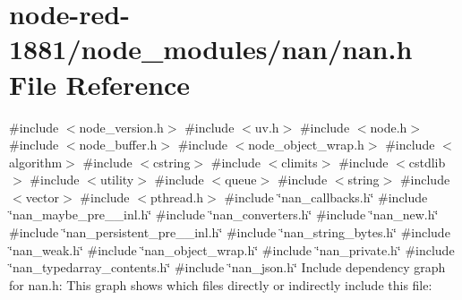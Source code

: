 \section{node-\/red-\/1881/node\+\_\+modules/nan/nan.h File Reference}
\label{nan_8h}
{\ttfamily \#include $<$node\+\_\+version.\+h$>$}\newline
{\ttfamily \#include $<$uv.\+h$>$}\newline
{\ttfamily \#include $<$node.\+h$>$}\newline
{\ttfamily \#include $<$node\+\_\+buffer.\+h$>$}\newline
{\ttfamily \#include $<$node\+\_\+object\+\_\+wrap.\+h$>$}\newline
{\ttfamily \#include $<$algorithm$>$}\newline
{\ttfamily \#include $<$cstring$>$}\newline
{\ttfamily \#include $<$climits$>$}\newline
{\ttfamily \#include $<$cstdlib$>$}\newline
{\ttfamily \#include $<$utility$>$}\newline
{\ttfamily \#include $<$queue$>$}\newline
{\ttfamily \#include $<$string$>$}\newline
{\ttfamily \#include $<$vector$>$}\newline
{\ttfamily \#include $<$pthread.\+h$>$}\newline
{\ttfamily \#include \char`\"{}nan\+\_\+callbacks.\+h\char`\"{}}\newline
{\ttfamily \#include \char`\"{}nan\+\_\+maybe\+\_\+pre\+\_\+\_\+inl.\+h\char`\"{}}\newline
{\ttfamily \#include \char`\"{}nan\+\_\+converters.\+h\char`\"{}}\newline
{\ttfamily \#include \char`\"{}nan\+\_\+new.\+h\char`\"{}}\newline
{\ttfamily \#include \char`\"{}nan\+\_\+persistent\+\_\+pre\+\_\+\_\+inl.\+h\char`\"{}}\newline
{\ttfamily \#include \char`\"{}nan\+\_\+string\+\_\+bytes.\+h\char`\"{}}\newline
{\ttfamily \#include \char`\"{}nan\+\_\+weak.\+h\char`\"{}}\newline
{\ttfamily \#include \char`\"{}nan\+\_\+object\+\_\+wrap.\+h\char`\"{}}\newline
{\ttfamily \#include \char`\"{}nan\+\_\+private.\+h\char`\"{}}\newline
{\ttfamily \#include \char`\"{}nan\+\_\+typedarray\+\_\+contents.\+h\char`\"{}}\newline
{\ttfamily \#include \char`\"{}nan\+\_\+json.\+h\char`\"{}}\newline
Include dependency graph for nan.\+h\+:
This graph shows which files directly or indirectly include this file\+:
